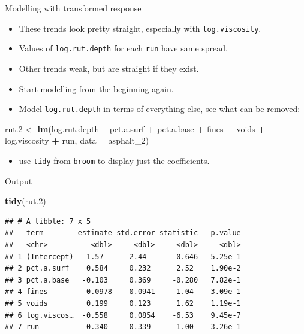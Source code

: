 \documentclass[
  ignorenonframetext,
]{beamer}
\newenvironment{Shaded}{\begin{snugshade}}{\end{snugshade}}
\newcommand{\DataTypeTok}[1]{\textcolor[rgb]{0.13,0.29,0.53}{#1}}
\newcommand{\DecValTok}[1]{\textcolor[rgb]{0.00,0.00,0.81}{#1}}
\newcommand{\FloatTok}[1]{\textcolor[rgb]{0.00,0.00,0.81}{#1}}
\newcommand{\KeywordTok}[1]{\textcolor[rgb]{0.13,0.29,0.53}{\textbf{#1}}}
\newcommand{\NormalTok}[1]{#1}
\newcommand{\OperatorTok}[1]{\textcolor[rgb]{0.81,0.36,0.00}{\textbf{#1}}}
\newcommand{\StringTok}[1]{\textcolor[rgb]{0.31,0.60,0.02}{#1}}
\providecommand{\tightlist}{%
  \setlength{\itemsep}{0pt}\setlength{\parskip}{0pt}}
\begin{document}
\begin{frame}[fragile]{Modelling with transformed response}
\protect\hypertarget{modelling-with-transformed-response}{}

\begin{itemize}
\tightlist
\item
  These trends look pretty straight, especially with
  \texttt{log.viscosity}.
\item
  Values of \texttt{log.rut.depth} for each \texttt{run} have same
  spread.
\item
  Other trends weak, but are straight if they exist.
\item
  Start modelling from the beginning again.
\item
  Model \texttt{log.rut.depth} in terms of everything else, see what can
  be removed:
\end{itemize}

\begin{Shaded}
\begin{Highlighting}[]
\NormalTok{rut}\FloatTok{.2}\NormalTok{ <-}\StringTok{ }\KeywordTok{lm}\NormalTok{(log.rut.depth }\OperatorTok{~}\StringTok{ }\NormalTok{pct.a.surf }\OperatorTok{+}\StringTok{ }\NormalTok{pct.a.base }\OperatorTok{+}
\StringTok{  }\NormalTok{fines }\OperatorTok{+}\StringTok{ }\NormalTok{voids }\OperatorTok{+}\StringTok{ }\NormalTok{log.viscosity }\OperatorTok{+}\StringTok{ }\NormalTok{run, }\DataTypeTok{data =}\NormalTok{ asphalt_}\DecValTok{2}\NormalTok{)}
\end{Highlighting}
\end{Shaded}

\begin{itemize}
\tightlist
\item
  use \texttt{tidy} from \texttt{broom} to display just the
  coefficients.
\end{itemize}

\end{frame}

\begin{frame}[fragile]{Output}
\protect\hypertarget{output}{}

\begin{Shaded}
\begin{Highlighting}[]
\KeywordTok{tidy}\NormalTok{(rut}\FloatTok{.2}\NormalTok{)}
\end{Highlighting}
\end{Shaded}

\begin{verbatim}
## # A tibble: 7 x 5
##   term        estimate std.error statistic   p.value
##   <chr>          <dbl>     <dbl>     <dbl>     <dbl>
## 1 (Intercept)  -1.57      2.44      -0.646   5.25e-1
## 2 pct.a.surf    0.584     0.232      2.52    1.90e-2
## 3 pct.a.base   -0.103     0.369     -0.280   7.82e-1
## 4 fines         0.0978    0.0941     1.04    3.09e-1
## 5 voids         0.199     0.123      1.62    1.19e-1
## 6 log.viscos…  -0.558     0.0854    -6.53    9.45e-7
## 7 run           0.340     0.339      1.00    3.26e-1
\end{verbatim}

\end{frame}
\end{document}
